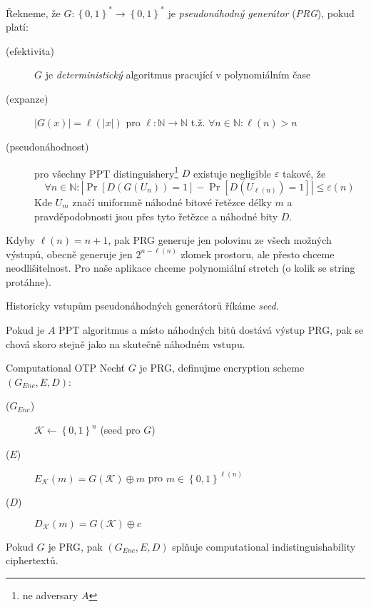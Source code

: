 \documentclass[a4paper,12pt,titlepage]{article}
\def\definice{\noindent {\bf Definice: }}
\def\tvrzeni{\noindent {\bf Tvrzení: }}
\def\m#1{{\mathcal{#1}}}
\begin{document}
\definice Řekneme, že $G\colon \left\{ 0,1 \right\}^* \rightarrow \left\{ 0,1 \right\}^*$ je \emph{pseudonáhodný generátor} (\emph{PRG}), pokud platí:
\begin{description}
	\item[(efektivita)]  $G$ je \textit{deterministický} algoritmus pracující v polynomiálním čase
	\item[(expanze)]  $|G(x)| = \ell(|x|)$ pro $\ell \colon \mathbb{N} \rightarrow \mathbb{N}$ t.ž. $\forall n\in \mathbb{N}\colon \ell(n) > n$
	\item[(pseudonáhodnost)]  pro všechny PPT distinguishery\footnote{ne adversary $A$} $D$ existuje negligible $\varepsilon$ takové, že
		$$\forall n\in \mathbb{N}\colon |\Pr[D(G(U_n)) = 1] - \Pr[D(U_{\ell(n)}) = 1] | \leq \varepsilon(n)$$
		Kde $U_m$ značí uniformně náhodné bitové řetězce délky $m$ a pravděpodobnosti jsou přes tyto řetězce a náhodné bity $D$.
\end{description}

Kdyby $\ell(n) = n+1$, pak PRG generuje jen polovinu ze všech možných výstupů, obecně generuje jen $2^{n - \ell(n)}$ zlomek prostoru, ale přesto chceme neodlišitelnost.
Pro naše aplikace chceme polynomiální stretch (o kolik se string protáhne).

Historicky vstupům pseudonáhodných generátorů říkáme \emph{seed}.

Pokud je $A$ PPT algoritmus a místo náhodných bitů dostává výstup PRG, pak se chová skoro stejně jako na skutečně náhodném vstupu.

\definice Computational OTP Nechť $G$ je PRG, definujme encryption scheme $(G_{Enc}, E, D)$:
\begin{description}
	\item[($G_{Enc}$)]  $\m K \leftarrow \left\{ 0,1 \right\}^n$ (seed pro $G$)
	\item[($E$)]  $E_{\m K}(m) = G(\m K) \oplus m$ pro $m \in \left\{ 0,1 \right\}^{\ell(n)}$
	\item[($D$)]  $D_{\m K}(m) = G(\m K) \oplus c$
\end{description}

\tvrzeni Pokud $G$ je PRG, pak $(G_{Enc}, E, D)$ splňuje computational indistinguishability ciphertextů.
\end{document}
